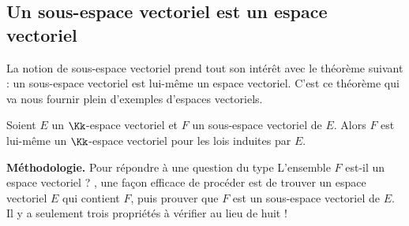 \documentclass[class=report,crop=false]{standalone}
\begin{document}

\subsection{Un sous-espace vectoriel est un espace vectoriel}


La notion de sous-espace vectoriel prend tout son intérêt avec le théorème suivant :
un sous-espace vectoriel est lui-même un espace vectoriel.
C'est ce théorème qui va nous fournir plein d'exemples d'espaces vectoriels.
\begin{theoreme}
\label{th:sevisev}
Soient $E$ un $\Kk$-espace vectoriel et $F$ un sous-espace vectoriel de $E$.
Alors $F$ est lui-même un $\Kk$-espace vectoriel pour les lois
induites par $E$.
\end{theoreme}



\textbf{Méthodologie.}
Pour répondre à une question du type \og L'ensemble $F$ est-il un espace vectoriel ? \fg,
une façon efficace de procéder est de trouver un espace vectoriel $E$ qui contient $F$,
puis prouver que $F$ est un sous-espace vectoriel de $E$.
Il y a seulement trois propriétés à vérifier au lieu de huit !

\bigskip
\end{document}
